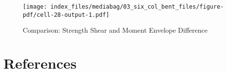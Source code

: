 \documentclass[
  letterpaper,
  DIV=11,
  numbers=noendperiod]{scrreprt}
\newlength{\cslhangindent}
\newenvironment{CSLReferences}[2] %
 {\begin{list}{}{%
  \setlength{\itemindent}{0pt}
  \setlength{\leftmargin}{0pt}
  \setlength{\parsep}{0pt}
  \ifodd #1
   \setlength{\leftmargin}{\cslhangindent}
   \setlength{\itemindent}{-1\cslhangindent}
  \fi
  \setlength{\itemsep}{#2\baselineskip}}}
 {\end{list}}
\begin{document}
\begin{figure}[H]

{\centering \texttt{[image: index\_files/mediabag/03\_six\_col\_bent\_files/figure-pdf/cell-28-output-1.pdf]}

}

\caption{Comparison: Strength Shear and Moment Envelope Difference}

\end{figure}%


\chapter*{References}\label{references}


\label{refs}
\begin{CSLReferences}{0}{1}
\end{CSLReferences}
\end{document}
